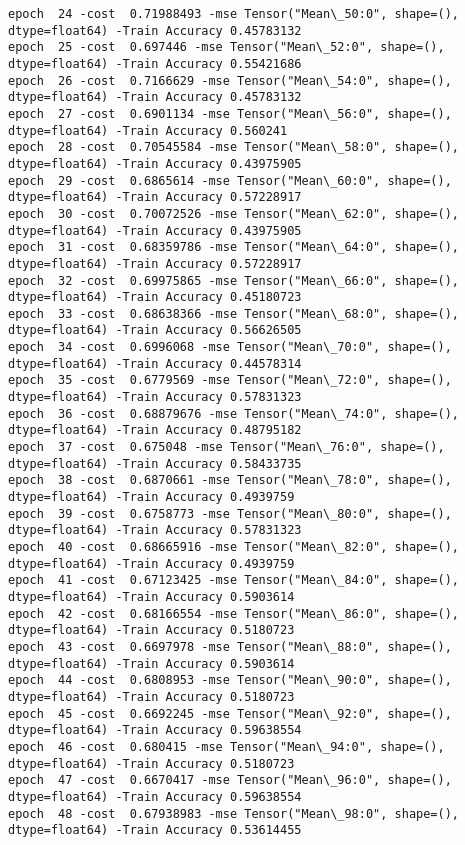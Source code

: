 \documentclass[11pt]{article}
\begin{document}
\begin{Verbatim}[commandchars=\\\{\}]
epoch  24 -cost  0.71988493 -mse Tensor("Mean\_50:0", shape=(), dtype=float64) -Train Accuracy 0.45783132
epoch  25 -cost  0.697446 -mse Tensor("Mean\_52:0", shape=(), dtype=float64) -Train Accuracy 0.55421686
epoch  26 -cost  0.7166629 -mse Tensor("Mean\_54:0", shape=(), dtype=float64) -Train Accuracy 0.45783132
epoch  27 -cost  0.6901134 -mse Tensor("Mean\_56:0", shape=(), dtype=float64) -Train Accuracy 0.560241
epoch  28 -cost  0.70545584 -mse Tensor("Mean\_58:0", shape=(), dtype=float64) -Train Accuracy 0.43975905
epoch  29 -cost  0.6865614 -mse Tensor("Mean\_60:0", shape=(), dtype=float64) -Train Accuracy 0.57228917
epoch  30 -cost  0.70072526 -mse Tensor("Mean\_62:0", shape=(), dtype=float64) -Train Accuracy 0.43975905
epoch  31 -cost  0.68359786 -mse Tensor("Mean\_64:0", shape=(), dtype=float64) -Train Accuracy 0.57228917
epoch  32 -cost  0.69975865 -mse Tensor("Mean\_66:0", shape=(), dtype=float64) -Train Accuracy 0.45180723
epoch  33 -cost  0.68638366 -mse Tensor("Mean\_68:0", shape=(), dtype=float64) -Train Accuracy 0.56626505
epoch  34 -cost  0.6996068 -mse Tensor("Mean\_70:0", shape=(), dtype=float64) -Train Accuracy 0.44578314
epoch  35 -cost  0.6779569 -mse Tensor("Mean\_72:0", shape=(), dtype=float64) -Train Accuracy 0.57831323
epoch  36 -cost  0.68879676 -mse Tensor("Mean\_74:0", shape=(), dtype=float64) -Train Accuracy 0.48795182
epoch  37 -cost  0.675048 -mse Tensor("Mean\_76:0", shape=(), dtype=float64) -Train Accuracy 0.58433735
epoch  38 -cost  0.6870661 -mse Tensor("Mean\_78:0", shape=(), dtype=float64) -Train Accuracy 0.4939759
epoch  39 -cost  0.6758773 -mse Tensor("Mean\_80:0", shape=(), dtype=float64) -Train Accuracy 0.57831323
epoch  40 -cost  0.68665916 -mse Tensor("Mean\_82:0", shape=(), dtype=float64) -Train Accuracy 0.4939759
epoch  41 -cost  0.67123425 -mse Tensor("Mean\_84:0", shape=(), dtype=float64) -Train Accuracy 0.5903614
epoch  42 -cost  0.68166554 -mse Tensor("Mean\_86:0", shape=(), dtype=float64) -Train Accuracy 0.5180723
epoch  43 -cost  0.6697978 -mse Tensor("Mean\_88:0", shape=(), dtype=float64) -Train Accuracy 0.5903614
epoch  44 -cost  0.6808953 -mse Tensor("Mean\_90:0", shape=(), dtype=float64) -Train Accuracy 0.5180723
epoch  45 -cost  0.6692245 -mse Tensor("Mean\_92:0", shape=(), dtype=float64) -Train Accuracy 0.59638554
epoch  46 -cost  0.680415 -mse Tensor("Mean\_94:0", shape=(), dtype=float64) -Train Accuracy 0.5180723
epoch  47 -cost  0.6670417 -mse Tensor("Mean\_96:0", shape=(), dtype=float64) -Train Accuracy 0.59638554
epoch  48 -cost  0.67938983 -mse Tensor("Mean\_98:0", shape=(), dtype=float64) -Train Accuracy 0.53614455

\end{Verbatim}
\end{document}
